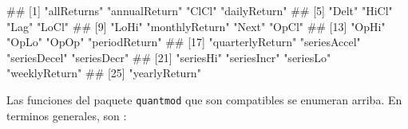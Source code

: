 \documentclass[
]{book}
\newenvironment{Shaded}{\begin{snugshade}}{\end{snugshade}}
\newcommand{\NormalTok}[1]{#1}
\begin{document}
\begin{Shaded}
\begin{Highlighting}[]
\NormalTok{\#\#  [1] "allReturns"      "annualReturn"    "ClCl"            "dailyReturn"    }
\NormalTok{\#\#  [5] "Delt"            "HiCl"            "Lag"             "LoCl"           }
\NormalTok{\#\#  [9] "LoHi"            "monthlyReturn"   "Next"            "OpCl"           }
\NormalTok{\#\# [13] "OpHi"            "OpLo"            "OpOp"            "periodReturn"   }
\NormalTok{\#\# [17] "quarterlyReturn" "seriesAccel"     "seriesDecel"     "seriesDecr"     }
\NormalTok{\#\# [21] "seriesHi"        "seriesIncr"      "seriesLo"        "weeklyReturn"   }
\NormalTok{\#\# [25] "yearlyReturn"}
\end{Highlighting}
\end{Shaded}

Las funciones del paquete \texttt{quantmod} que son compatibles se enumeran arriba. En terminos generales, son :
\end{document}

